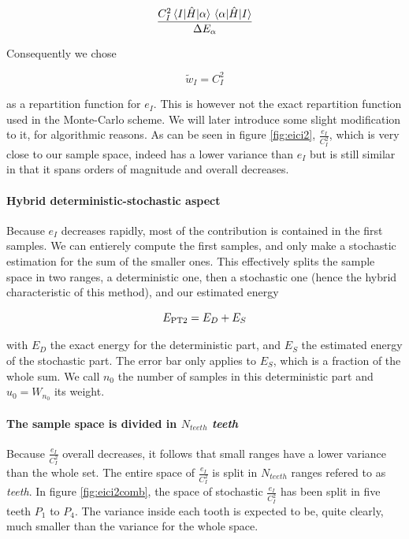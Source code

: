 \documentclass[./thesis.tex]{subfiles}
\begin{document}
\begin{equation}
\frac{C_I^2 \mel{I}{\hat{H}}{\alpha}\mel{\alpha}{\hat{H}}{I}}{\Delta E_{\alpha}}
\end{equation}

Consequently we chose

\begin{equation}
\tilde w_I = C_I^2
\end{equation}

as a repartition function for $e_I$. This is however not the exact repartition function used in the Monte-Carlo scheme. We will later introduce some slight modification to it, for algorithmic reasons.
As can be seen in figure \ref{fig:eici2}, $\frac{e_I}{C_I^2}$, which is very close to our sample space, indeed has a lower variance than $e_I$ but is still similar in that it spans orders of magnitude and overall decreases.

\paragraph{Hybrid deterministic-stochastic aspect}
Because $e_I$ decreases rapidly, most of the contribution is contained in the first samples. We can entierely compute the first samples, and only make a stochastic estimation for the sum of the smaller ones. This effectively splits the sample space in two ranges, a deterministic one, then a stochastic one (hence the hybrid characteristic of this method), and our estimated energy

\begin{equation}
E_\text{PT2} = E_D + E_S
\end{equation}

with $E_D$ the exact energy for the deterministic part, and $E_S$ the estimated energy of the stochastic part. The error bar only applies to $E_S$, which is a fraction of the whole sum.
We call $n_0$ the number of samples in this deterministic part and $u_0 = W_{n_0}$ its weight.



\paragraph{The sample space is divided in $N_{teeth}$ \emph{teeth}}

Because $\frac{e_I}{C_I^2}$ overall decreases, it follows that small ranges have a lower variance than the whole set. The entire space of $\frac{e_I}{C_I^2}$ is split in $N_{teeth}$ ranges refered to as \emph{teeth}. In figure \ref{fig:eici2comb}, the space of stochastic $\frac{e_I}{C_I^2}$ has been split in \alert{five teeth $P_1$ to $P_4$}. The variance inside each tooth is expected to be, quite clearly, much smaller than the variance for the whole space.
\end{document}

